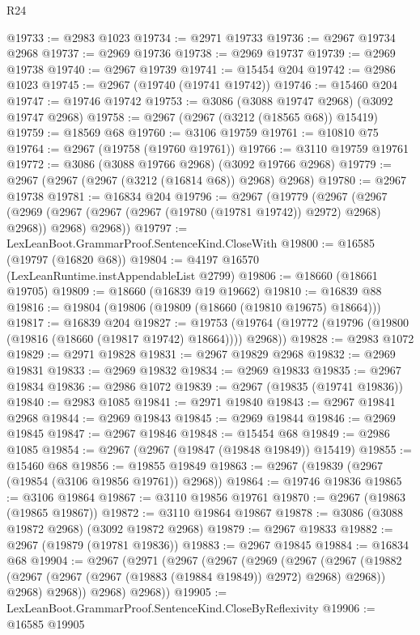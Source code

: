 \begin{lexlean}{R24}
\begin{coremodule}
@19733 := @2983 @1023
@19734 := @2971 @19733
@19736 := @2967 @19734 @2968
@19737 := @2969 @19736
@19738 := @2969 @19737
@19739 := @2969 @19738
@19740 := @2967 @19739
@19741 := @15454 @204
@19742 := @2986 @1023
@19745 := @2967 (@19740 (@19741 @19742))
@19746 := @15460 @204
@19747 := @19746 @19742
@19753 := @3086 (@3088 @19747 @2968) (@3092 @19747 @2968)
@19758 := @2967 (@2967 (@3212 (@18565 @68)) @15419)
@19759 := @18569 @68
@19760 := @3106 @19759
@19761 := @10810 @75
@19764 := @2967 (@19758 (@19760 @19761))
@19766 := @3110 @19759 @19761
@19772 := @3086 (@3088 @19766 @2968) (@3092 @19766 @2968)
@19779 := @2967 (@2967 (@2967 (@3212 (@16814 @68)) @2968) @2968)
@19780 := @2967 @19738
@19781 := @16834 @204
@19796 := @2967
    (@19779
      (@2967
        (@2967 (@2969 (@2967 (@2967 (@2967 (@19780 (@19781 @19742)) @2972) @2968) @2968)) @2968)
        @2968))
@19797 := LexLeanBoot.GrammarProof.SentenceKind.CloseWith
@19800 := @16585 (@19797 (@16820 @68))
@19804 := @4197 @16570 (LexLeanRuntime.instAppendableList @2799)
@19806 := @18660 (@18661 @19705)
@19809 := @18660 (@16839 @19 @19662)
@19810 := @16839 @88
@19816 := @19804 (@19806 (@19809 (@18660 (@19810 @19675) @18664)))
@19817 := @16839 @204
@19827 := @19753 (@19764 (@19772 (@19796 (@19800 (@19816 (@18660 (@19817 @19742) @18664)))) @2968))
@19828 := @2983 @1072
@19829 := @2971 @19828
@19831 := @2967 @19829 @2968
@19832 := @2969 @19831
@19833 := @2969 @19832
@19834 := @2969 @19833
@19835 := @2967 @19834
@19836 := @2986 @1072
@19839 := @2967 (@19835 (@19741 @19836))
@19840 := @2983 @1085
@19841 := @2971 @19840
@19843 := @2967 @19841 @2968
@19844 := @2969 @19843
@19845 := @2969 @19844
@19846 := @2969 @19845
@19847 := @2967 @19846
@19848 := @15454 @68
@19849 := @2986 @1085
@19854 := @2967 (@2967 (@19847 (@19848 @19849)) @15419)
@19855 := @15460 @68
@19856 := @19855 @19849
@19863 := @2967 (@19839 (@2967 (@19854 (@3106 @19856 @19761)) @2968))
@19864 := @19746 @19836
@19865 := @3106 @19864
@19867 := @3110 @19856 @19761
@19870 := @2967 (@19863 (@19865 @19867))
@19872 := @3110 @19864 @19867
@19878 := @3086 (@3088 @19872 @2968) (@3092 @19872 @2968)
@19879 := @2967 @19833
@19882 := @2967 (@19879 (@19781 @19836))
@19883 := @2967 @19845
@19884 := @16834 @68
@19904 := @2967
    (@2971
      (@2967
        (@2967
          (@2969
            (@2967
              (@2967
                (@19882 (@2967 (@2967 (@2967 (@19883 (@19884 @19849)) @2972) @2968) @2968))
                @2968)
              @2968))
          @2968)
        @2968))
@19905 := LexLeanBoot.GrammarProof.SentenceKind.CloseByReflexivity
@19906 := @16585 @19905

\end{coremodule}
\end{lexlean}
